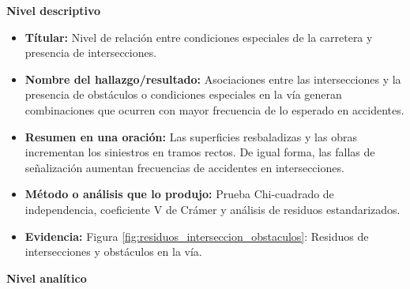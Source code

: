 \documentclass[12pt]{article}
\begin{document}
\textbf{Nivel descriptivo}
\begin{itemize}
    \item \textbf{Títular:} Nivel de relación entre condiciones especiales de la 
    carretera y presencia de intersecciones.
    
    \item \textbf{Nombre del hallazgo/resultado:} Asociaciones entre las intersecciones 
    y la presencia de obstáculos o condiciones especiales en la vía generan combinaciones 
    que ocurren con mayor frecuencia de lo esperado en accidentes. 

    
    \item \textbf{Resumen en una oración:} Las superficies resbaladizas y las 
    obras incrementan los siniestros en tramos rectos. De igual forma, las fallas 
    de señalización aumentan frecuencias de accidentes en intersecciones.

    
    \item \textbf{Método o análisis que lo produjo:} Prueba Chi-cuadrado de independencia, 
    coeficiente V de Crámer y análisis de residuos estandarizados.

    
    \item \textbf{Evidencia:} Figura \ref{fig:residuos_interseccion_obstaculos}: Residuos de
    intersecciones y obstáculos en la vía. \\
    

\end{itemize}

\textbf{Nivel analítico}
\end{document}
